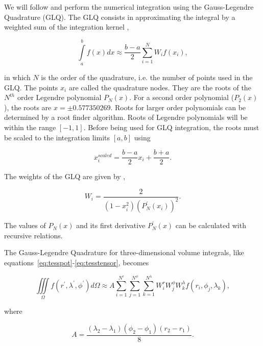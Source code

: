 \documentclass[manuscript,endfloat]{geophysics}
\begin{document}
We will follow \citet{Asgharzadeh2007} and perform the numerical integration
using the Gauss-Legendre Quadrature (GLQ).
The GLQ consists in approximating the integral by a weighted sum of the
integration kernel \citep{Hildebrand1987},

\begin{equation}
    \int\limits_a^b f(x) dx \approx
    \frac{b-a}{2}\sum\limits_{i=1}^N W_i f(x_i),
    \label{eq:glq1d}
\end{equation}

\noindent
in which $N$ is the order of the quadrature,
i.e. the number of points used in the GLQ.
The points $x_i$ are called the quadrature nodes.
They are the roots of the $N^{th}$ order Legendre polynomial $P_N(x)$.
For a second order polynomial ($P_2(x)$),
the roots are $x = \pm 0.577350269$.
Roots for larger order polynomials
can be determined by a root finder algorithm.
Roots of Legendre polynomials
will be within the range $[-1, 1]$.
Before being used for GLQ integration,
the roots must be scaled to the integration limits $[a, b]$ using

\begin{equation}
    x^{scaled}_i = \frac{b - a}{2} x_i + \frac{b + a}{2}.
    \label{eq:glq_scaling}
\end{equation}

The weights of the GLQ are given by \citep{Hildebrand1987},

\begin{equation}
    W_i = \frac{2}{(1 - x_i^2)(P^\prime_N(x_i))^2}.
    \label{eq:glq_weights}
\end{equation}

\noindent
The values of $P_N(x)$ and its first derivative $P^\prime_N(x)$
can be calculated with recursive relations.

The Gauss-Legendre Quadrature for three-dimensional volume integrals,
like equations~\ref{eq:tesspot}-\ref{eq:tesstensor},
becomes \citep{Asgharzadeh2007}

\begin{equation}
    \iiint\limits_{\Omega}
    f(r^\prime, \lambda^\prime, \phi^\prime)
    d\Omega
    \approx
    A
    \sum\limits_{i=1}^{N^r}
    \sum\limits_{j=1}^{N^\phi}
    \sum\limits_{k=1}^{N^\lambda}
    W_i^r W_j^\phi W_k^\lambda
    f(r_i, \phi_j, \lambda_k),
    \label{eq:glq3d}
\end{equation}

\noindent
where

\begin{equation}
    A = \frac{(\lambda_2 - \lambda_1)(\phi_2 - \phi_1)(r_2 - r_1)}{8}.
\end{equation}
\end{document}
